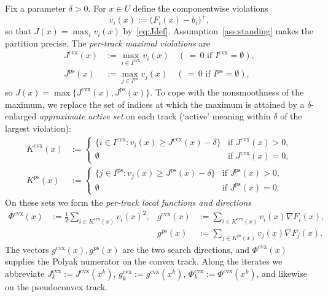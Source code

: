 \documentclass[]{interact}
\theoremstyle{plain}
\theoremstyle{definition}
\theoremstyle{remark}
\newcommand{\cvx}{\mathrm{cvx}}
\newcommand{\ps}{\mathrm{ps}}
\begin{document}
Fix a parameter $\delta>0$. For $x\in U$ define the componentwise violations
\begin{equation}\label{eq:vi}
v_i(x):=\bigl(F_i(x)-b_i\bigr)^+,
\end{equation}
so that $J(x)=\max_i v_i(x)$ by~\eqref{eq:Jdef}. Assumption~\ref{ass:standing} makes the
partition precise. The \emph{per-track maximal violations} are
\begin{align}
J^{\cvx}(x)&:=\max_{i\in I^{\cvx}}v_i(x)\quad(\,{=}\,0\text{ if }I^{\cvx}=\emptyset),\label{eq:Jcvx}\\
J^{\ps}(x)&:=\max_{j\in I^{\ps}}v_j(x)\quad(\,{=}\,0\text{ if }I^{\ps}=\emptyset),\label{eq:Jps}
\end{align}
so $J(x)=\max\{J^{\cvx}(x),J^{\ps}(x)\}$. To cope with the nonsmoothness of the maximum,
we replace the set of indices at which the maximum is attained by a $\delta$-enlarged
\emph{approximate active set} on each track (`active' meaning within $\delta$ of the largest
violation):
\begin{align}
K^{\cvx}(x)&:=\begin{cases}\{i\in I^{\cvx}:v_i(x)\ge J^{\cvx}(x)-\delta\} & \text{if }J^{\cvx}(x)>0,\\ \emptyset & \text{if }J^{\cvx}(x)=0,\end{cases}\label{eq:Kcvx}\\[2pt]
K^{\ps}(x)&:=\begin{cases}\{j\in I^{\ps}:v_j(x)\ge J^{\ps}(x)-\delta\} & \text{if }J^{\ps}(x)>0,\\ \emptyset & \text{if }J^{\ps}(x)=0.\end{cases}\label{eq:Kps}
\end{align}
On these sets we form the \emph{per-track local functions and directions}
\begin{align}
\Phi^{\cvx}(x)&:=\tfrac12\!\!\sum_{i\in K^{\cvx}(x)}\!\! v_i(x)^2, & g^{\cvx}(x)&:=\!\!\sum_{i\in K^{\cvx}(x)}\!\! v_i(x)\nabla F_i(x),\label{eq:phi-g-cvx}\\
& & g^{\ps}(x)&:=\!\!\sum_{j\in K^{\ps}(x)}\!\! v_j(x)\nabla F_j(x).\label{eq:phi-g-ps}
\end{align}
The vectors $g^{\cvx}(x),g^{\ps}(x)$ are the two search directions, and $\Phi^{\cvx}(x)$
supplies the Polyak numerator on the convex track. Along the iterates we abbreviate
$J^{\cvx}_k:=J^{\cvx}(x^k)$, $g^{\cvx}_k:=g^{\cvx}(x^k)$, $\Phi^{\cvx}_k:=\Phi^{\cvx}(x^k)$,
and likewise on the pseudoconvex track.
\end{document}

